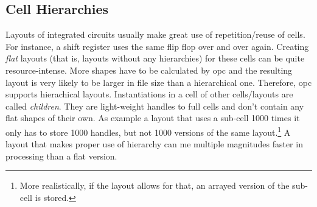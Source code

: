 \subsection{Cell Hierarchies}\label{sec:hierarchies}
Layouts of integrated circuits usually make great use of repetition/reuse of cells.
For instance, a shift register uses the same flip flop over and over again.
Creating \emph{flat} layouts (that is, layouts without any hierarchies) for these cells can be quite resource-intense.
More shapes have to be calculated by opc and the resulting layout is very likely to be larger in file size than a hierarchical one.
Therefore, opc supports hierachical layouts.
Instantiations in a cell of other cells/layouts are called \emph{children}.
They are light-weight handles to full cells and don't contain any flat shapes of their own.
As example a layout that uses a sub-cell 1000 times it only has to store 1000 handles, but not 1000 versions of the same layout.\footnote{More realistically, if the layout allows for that, an arrayed version of the sub-cell is stored.}
A layout that makes proper use of hierarchy can me multiple magnitudes faster in processing than a flat version.

